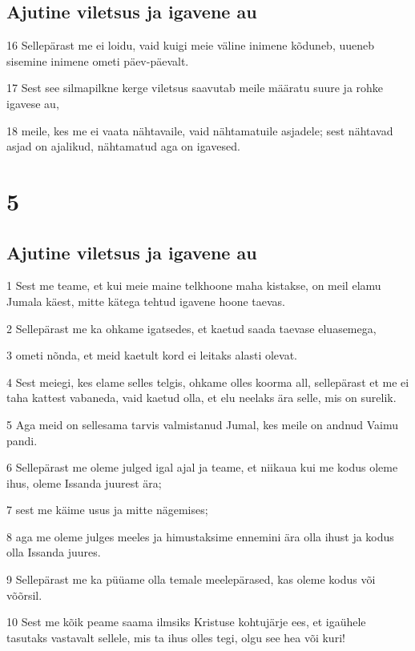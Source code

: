 \section*{Ajutine viletsus ja igavene au}

\par 16 Sellepärast me ei loidu, vaid kuigi meie väline inimene kõduneb, uueneb sisemine inimene ometi päev-päevalt.
\par 17 Sest see silmapilkne kerge viletsus saavutab meile määratu suure ja rohke igavese au,
\par 18 meile, kes me ei vaata nähtavaile, vaid nähtamatuile asjadele; sest nähtavad asjad on ajalikud, nähtamatud aga on igavesed.


\chapter{5}

\section*{Ajutine viletsus ja igavene au}

\par 1 Sest me teame, et kui meie maine telkhoone maha kistakse, on meil elamu Jumala käest, mitte kätega tehtud igavene hoone taevas.
\par 2 Sellepärast me ka ohkame igatsedes, et kaetud saada taevase eluasemega,
\par 3 ometi nõnda, et meid kaetult kord ei leitaks alasti olevat.
\par 4 Sest meiegi, kes elame selles telgis, ohkame olles koorma all, sellepärast et me ei taha kattest vabaneda, vaid kaetud olla, et elu neelaks ära selle, mis on surelik.
\par 5 Aga meid on sellesama tarvis valmistanud Jumal, kes meile on andnud Vaimu pandi.
\par 6 Sellepärast me oleme julged igal ajal ja teame, et niikaua kui me kodus oleme ihus, oleme Issanda juurest ära;
\par 7 sest me käime usus ja mitte nägemises;
\par 8 aga me oleme julges meeles ja himustaksime ennemini ära olla ihust ja kodus olla Issanda juures.
\par 9 Sellepärast me ka püüame olla temale meelepärased, kas oleme kodus või võõrsil.
\par 10 Sest me kõik peame saama ilmsiks Kristuse kohtujärje ees, et igaühele tasutaks vastavalt sellele, mis ta ihus olles tegi, olgu see hea või kuri!

